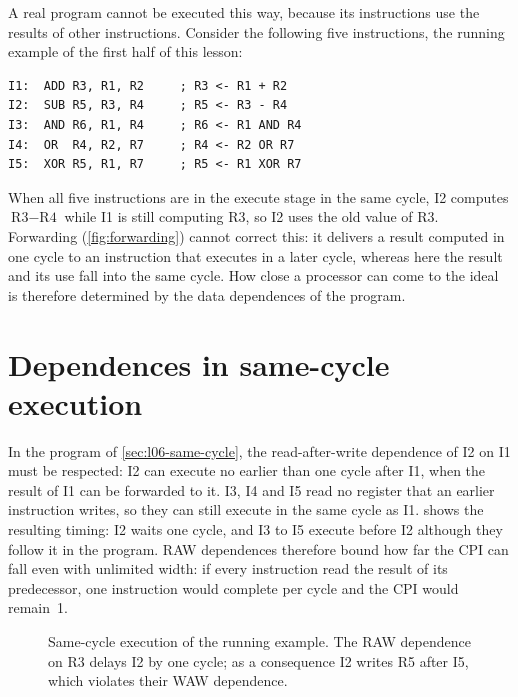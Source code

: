 \documentclass[../main.tex]{subfiles}
\begin{document}
A real program cannot be executed this way, because its instructions use
the results of other instructions.  Consider the following five
instructions, the running example of the first half of this lesson:%
\begin{marginfigure}
  \resizebox{\linewidth}{!}{}
  \caption{The ideal: all $N$ instructions pass through the stages in the
    same five cycles.}
  \label{fig:l06-same-cycle}
\end{marginfigure}
\begin{lstlisting}[language={[x86masm]Assembler}, numbers=none]
I1:  ADD R3, R1, R2     ; R3 <- R1 + R2
I2:  SUB R5, R3, R4     ; R5 <- R3 - R4
I3:  AND R6, R1, R4     ; R6 <- R1 AND R4
I4:  OR  R4, R2, R7     ; R4 <- R2 OR R7
I5:  XOR R5, R1, R7     ; R5 <- R1 XOR R7
\end{lstlisting}
When all five instructions are in the execute stage in the same cycle, I2
computes $\text{R3} - \text{R4}$ while I1 is still computing R3, so I2 uses
the old value of R3.  Forwarding (\cref{fig:forwarding}) cannot correct
this: it delivers a result computed in one cycle to an instruction that
executes in a later cycle, whereas here the result and its use fall into the
same cycle.  How close a processor can come to the ideal is therefore
determined by the data dependences of the program.

\section{Dependences in same-cycle execution}
\label{sec:l06-dependences}

In the program of \cref{sec:l06-same-cycle}, the read-after-write dependence
of I2 on I1 must be respected: I2 can execute
no earlier than one cycle after I1, when the result of I1 can be forwarded to
it.  I3, I4 and I5 read no register
that an earlier instruction writes, so they can still execute in the same
cycle as I1.   shows the resulting timing: I2 waits
one cycle, and I3 to I5 execute before I2 although they follow it in the
program.  RAW dependences therefore bound how far the CPI can fall even with
unlimited width: if every instruction read the result of its predecessor,
one instruction would complete per cycle and the CPI would remain~1.

\begin{figure}[htbp]
  \centering
  
  \caption{Same-cycle execution of the running example.  The RAW dependence
    on R3 delays I2 by one cycle; as a consequence I2 writes R5 after I5,
    which violates their WAW dependence.}
  \label{fig:l06-dependences}
\end{figure}
\end{document}
